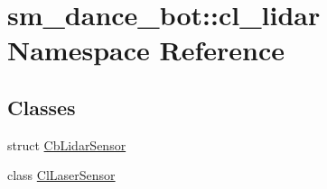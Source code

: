\hypertarget{namespacesm__dance__bot_1_1cl__lidar}{}\section{sm\+\_\+dance\+\_\+bot\+:\+:cl\+\_\+lidar Namespace Reference}
\label{namespacesm__dance__bot_1_1cl__lidar}
\subsection*{Classes}
\begin{DoxyCompactItemize}
\item 
struct \hyperlink{structsm__dance__bot_1_1cl__lidar_1_1CbLidarSensor}{Cb\+Lidar\+Sensor}
\item 
class \hyperlink{classsm__dance__bot_1_1cl__lidar_1_1ClLaserSensor}{Cl\+Laser\+Sensor}
\end{DoxyCompactItemize}
